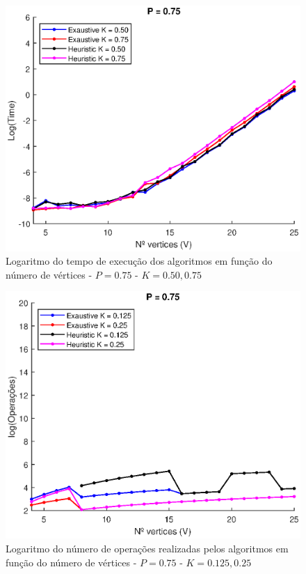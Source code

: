 \documentclass{revdetua}
\begin{document}
\begin{figure}[h!]
\centering
\includegraphics[scale = 0.5]{Figs/2_P075.eps}
\caption{Logaritmo do tempo de execução dos algoritmos em função do número de vértices - $P = 0.75$ - $K = 0.50, 0.75$}
\label{2_P075}
\end{figure}

\begin{figure}[h!]
\centering
\includegraphics[scale = 0.5]{Figs/3_P075.eps}
\caption{Logaritmo do número de operações realizadas pelos algoritmos em função do número de vértices - $P = 0.75$ - $K = 0.125, 0.25$}
\label{3_P075}
\end{figure}
\end{document}
